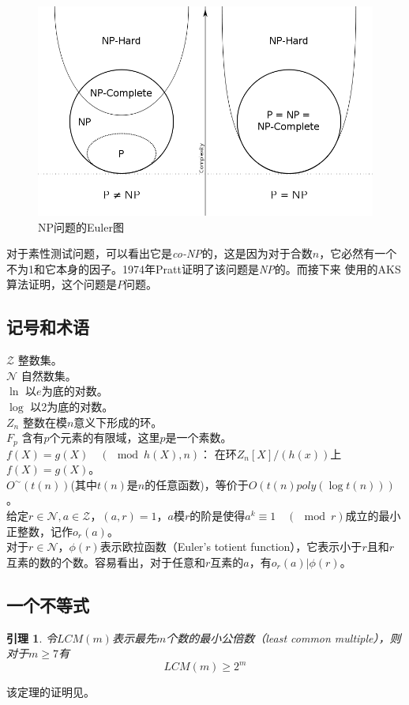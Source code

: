 \documentclass[a4paper]{article}
\newtheorem{lemma}{引理}[section]
\numberwithin{equation}{section}
\begin{document}
\begin{multicols}{2}
  \begin{figure}[htbp]
    \centering
    \includegraphics[width=\columnwidth]{fig/np}
    \caption{NP问题的Euler图}
    \label{fig:np}
  \end{figure}

  \textnormal
  对于素性测试问题，可以看出它是\textit{co-NP}的，这是因为对于合数$n$，它必然有一个不为1和它本身的因子。1974年Pratt证明了该问题是\textit{NP}的\cite{aks}。而接下来
  使用的AKS算法证明，这个问题是$P$问题。
  \subsection{记号和术语}
  \noindent
  $\mathcal{Z}$ 整数集。\\
  $\mathcal{N}$ 自然数集。\\
  $\ln$ 以$e$为底的对数。\\
  $\log$ 以2为底的对数。\\
  $\mathit{Z}_n$ 整数在模$n$意义下形成的环。\\
  $F_p$ 含有$p$个元素的有限域，这里$p$是一个素数。\\
  $f(X)=g(X)\quad(\!\!\!\!\!\mod{h(X)},n)$：
  在环$\mathit{Z}_n\left[X\right]/(h(x))$上$f(X)=g(X)$。\\
  $O^{\sim}(t(n))$(其中$t(n)$是$n$的任意函数)，等价于$O (t(n)poly(\log t(n)))$。\\
  给定$r\in \mathcal{N},a\in \mathcal{Z}$，$(a,r)=1$，$a$模$r$的阶是使得$a^k\equiv
  1\quad(\!\!\!\!\!\mod{r})$成立的最小正整数，记作$o_r (a)$。\\
  对于$r\in \mathcal{N}$，$\phi(r)$表示欧拉函数（Euler’s totient
  function），它表示小于$r$且和$r$互素的数的个数。容易看出，对于任意和$r$互素的$a$，有$o_r (a)|\phi(r)$。
  \subsection{一个不等式}
  \begin{lemma}\label{lcm}
    \upshape 令$LCM(m)$表示最先$m$个数的最小公倍数（least common
    multiple），则对于$m\ge 7$有
    \begin{equation}
      LCM(m)\ge 2^m
    \end{equation}
  \end{lemma}
  该定理的证明见\cite{nai82}。


\end{multicols}
\end{document}
